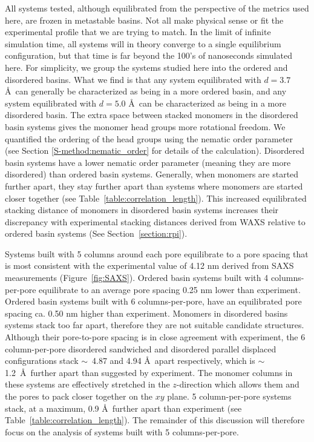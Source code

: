   All systems tested, although equilibrated from the perspective of the metrics
  used here, are frozen in metastable basins. Not all make physical sense or fit
  the experimental profile that we are trying to match. In the limit of infinite
  simulation time, all systems will in theory converge to a single equilibrium
  configuration, but that time is far beyond the 100's of nanoseconds simulated
  here. For simplicity, we group the systems studied here into the ordered and
  disordered basins. What we find is that any system equilibrated with
  $\mathit{d}=3.7$ \AA~can generally be characterized as being in a more ordered
  basin, and any system equilibrated with $\mathit{d}=5.0$ \AA~can be
  characterized as being in a more disordered basin. The extra space between
  stacked monomers in the disordered basin systems gives the monomer head groups
  more rotational freedom. We quantified the ordering of the head groups using
  the nematic order parameter (see Section \ref{S-method:nematic_order} for
  details of the calculation). Disordered basin systems have a lower nematic
  order parameter (meaning they are more disordered) than ordered basin systems.
  Generally, when monomers are started further apart, they stay further apart
  than systems where monomers are started closer together (see
  Table~\ref{table:correlation_length}). This increased equilibrated stacking
  distance of monomers in disordered basin systems increases their discrepancy
  with experimental stacking distances derived from WAXS relative to ordered
  basin systems (See Section~\ref{section:rpi}). 
  
  \label{6colperpore}
  Systems built with 5 columns around each pore equilibrate to a pore spacing
  that is most consistent with the experimental value of 4.12 nm derived from
  SAXS measurements (Figure~\ref{fig:SAXS}). Ordered basin systems built with 4
  columns-per-pore equilibrate to an average pore spacing 0.25 nm lower than
  experiment. Ordered basin systems built with 6 columns-per-pore, have an
  equilibrated pore spacing ca. 0.50 nm higher than experiment. Monomers in 
  disordered basins systems stack too far apart, therefore they are not 
  suitable candidate structures. Although their pore-to-pore spacing is in
  close agreement with experiment, the 6 column-per-pore disordered 
  sandwiched and disordered parallel displaced configurations stack 
  $\sim$~4.87 and 4.94 \AA~apart respectively, which is $\sim$ 
  1.2~\AA~further apart than suggested by experiment. The monomer columns in
  these systems are effectively stretched in the $z$-direction which allows
  them and the pores to pack closer together on the $xy$ plane. 5 column-per-pore
  systems stack, at a maximum, 0.9 \AA~further apart than experiment 
  (see Table~\ref{table:correlation_length}). The remainder of this discussion
  will therefore focus on the analysis of systems built with 5 columns-per-pore. 
  
